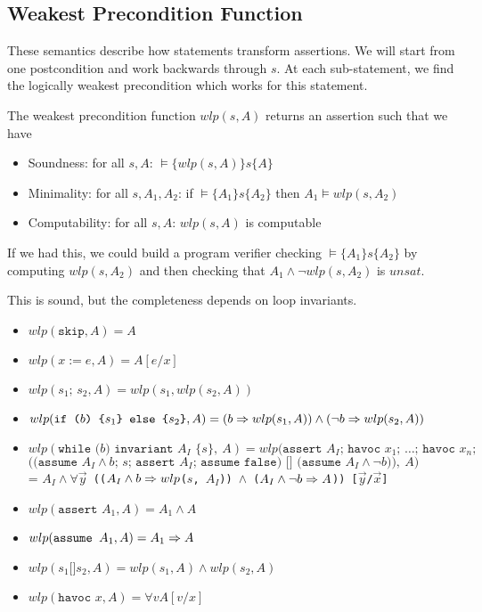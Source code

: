\subsection{Weakest Precondition Function}
\begin{mytitle} These semantics describe how statements transform assertions. We will start from one postcondition and work backwards through $s$. At each sub-statement, we find the logically weakest precondition which works for this statement.
\end{mytitle}
\begin{mytitle} The weakest precondition function $wlp(s, A)$ returns an assertion such that we have
\begin{itemize}
    \item Soundness: for all $s, A$: $\models\{wlp(s, A)\}s\{A\}$
    \item Minimality: for all $s, A_1, A_2$: if $\models\{A_1\}s\{A_2\}$ then $A_1\models wlp(s, A_2)$
    \item Computability: for all $s, A$: $wlp(s, A)$ is computable
\end{itemize}
If we had this, we could build a program verifier checking $\models\{A_1\}s\{A_2\}$ by computing $wlp(s, A_2)$ and then checking that $A_1\land \lnot wlp(s, A_2)$ is $unsat$.
\end{mytitle}
\begin{mytitle} This is sound, but the completeness depends on loop invariants.
\begin{itemize}
    \item $wlp(\texttt{skip}, A) = A$
    \item $wlp(x:=e, A) = A[e/x]$
    \item $wlp(\texttt{$s_1$; $s_2$}, A) = wlp(s_1, wlp(s_2, A))$
    \item $wlp(\texttt{if ($b$) \{$s_1$\} else \{$s_2$\}}, A) = (b\Rightarrow wlp(s_1,A)) \land(\lnot b \Rightarrow wlp(s_2, A))$
    \item $wlp(\texttt{while ($b$) invariant $A_I$ \{$s$\}},\ A) = wlp(\texttt{assert $A_I$; havoc $x_1$; \ldots ;\ havoc $x_n$;}$ \\ 
    $\texttt{((assume $A_I\land b$; $s$; assert $A_I$; assume false) [] (assume $A_I\land \lnot b$))},\ A)$ \\
    = \texttt{$A_I\land \forall \vec{y}$ (($A_I\land b\Rightarrow wlp$($s$, $A_I$)) $\land$ ($A_I\land \lnot b\Rightarrow A$)) [$\vec{y}$/$\vec{x}$]}
    \item $wlp(\texttt{assert $A_1$}, A) = A_1\land A$
    \item $wlp(\texttt{assume $A_1$}, A) = A_1 \Rightarrow A$
    \item $wlp(\texttt{$s_1$[]$s_2$}, A) = wlp(s_1, A) \land wlp(s_2, A)$
    \item $wlp(\texttt{havoc $x$}, A) = \forall v A[v/x]$
\end{itemize}
\end{mytitle}